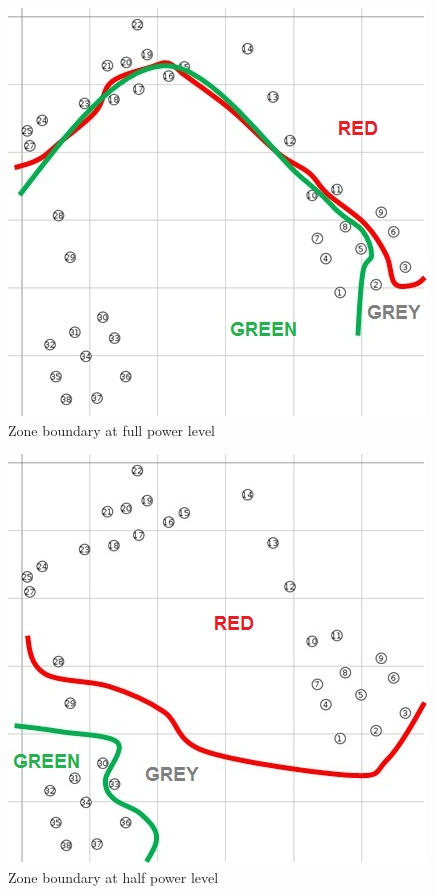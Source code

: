 \documentclass{CRPITStyle}
\begin{document}
\begin{figure}[t]
	\centering
        \includegraphics[width=.9\linewidth]{Owheo_full}
        \caption{Zone boundary at full power level}
        \label{subfig:owheo_full}
\end{figure}

\begin{figure}[t]
	\centering
        \includegraphics[width=.9\linewidth]{Owheo_half}
        \caption{Zone boundary at half power level}
        \label{subfig:owheo_half}
\end{figure}
\end{document}
